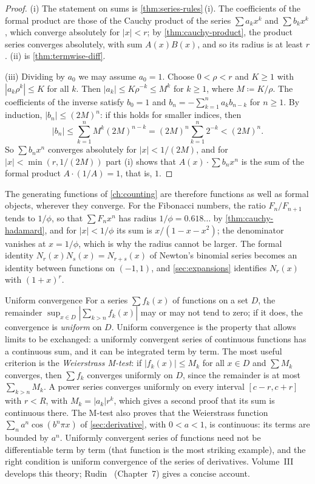 \begin{proof}
(i) The statement on sums is \cref{thm:series-rules}\,(i). The coefficients of the formal product are those of the Cauchy product of the series $\sum a_kx^k$ and $\sum b_kx^k$, which converge absolutely for $|x|<r$; by \cref{thm:cauchy-product}, the product series converges absolutely, with sum $A(x)B(x)$, and so its radius is at least $r$. (ii) is \cref{thm:termwise-diff}.

(iii) Dividing by $a_0$ we may assume $a_0=1$. Choose $0<\rho<r$ and $K\ge1$ with $|a_k\rho^k|\le K$ for all $k$. Then $|a_k|\le K\rho^{-k}\le M^k$ for $k\ge1$, where $M\coloneqq K/\rho$. The coefficients of the inverse satisfy $b_0=1$ and $b_n=-\sum_{k=1}^na_kb_{n-k}$ for $n\ge1$. By induction, $|b_n|\le(2M)^n$: if this holds for smaller indices, then
\[
|b_n|\le\sum_{k=1}^nM^k(2M)^{n-k}=(2M)^n\sum_{k=1}^n2^{-k}<(2M)^n .
\]
So $\sum b_nx^n$ converges absolutely for $|x|<1/(2M)$, and for $|x|<\min(r,1/(2M))$ part (i) shows that $A(x)\cdot\sum b_nx^n$ is the sum of the formal product $A\cdot(1/A)=1$, that is, $1$.
\end{proof}

The generating functions of \cref{ch:counting} are therefore functions as well as formal objects, wherever they converge. For the Fibonacci numbers, the ratio $F_n/F_{n+1}$ tends to $1/\phi$, so that $\sum F_nx^n$ has radius $1/\phi=0.618\ldots$ by \cref{thm:cauchy-hadamard}, and for $|x|<1/\phi$ its sum is $x/(1-x-x^2)$; the denominator vanishes at $x=1/\phi$, which is why the radius cannot be larger. The formal identity $N_r(x)N_s(x)=N_{r+s}(x)$ of Newton's binomial series becomes an identity between functions on $(-1,1)$, and \cref{sec:expansions} identifies $N_r(x)$ with $(1+x)^r$.

\begin{note}{Uniform convergence}
For a series $\sum f_k(x)$ of functions on a set $D$, the remainder $\sup_{x\in D}|\sum_{k>n}f_k(x)|$ may or may not tend to zero; if it does, the convergence is \emph{uniform} on $D$. Uniform convergence is the property that allows limits to be exchanged: a uniformly convergent series of continuous functions has a continuous sum, and it can be integrated term by term. The most useful criterion is the \emph{Weierstrass M-test}: if $|f_k(x)|\le M_k$ for all $x\in D$ and $\sum M_k$ converges, then $\sum f_k$ converges uniformly on $D$, since the remainder is at most $\sum_{k>n}M_k$. A power series converges uniformly on every interval $[c-r,c+r]$ with $r<R$, with $M_k=|a_k|r^k$, which gives a second proof that its sum is continuous there. The M-test also proves that the Weierstrass function $\sum_na^n\cos(b^n\pi x)$ of \cref{sec:derivative}, with $0<a<1$, is continuous: its terms are bounded by $a^n$. Uniformly convergent series of functions need not be differentiable term by term (that function is the most striking example), and the right condition is uniform convergence of the series of derivatives. Volume~III develops this theory; Rudin~\cite{rudin1976} (Chapter~7) gives a concise account.
\end{note}

